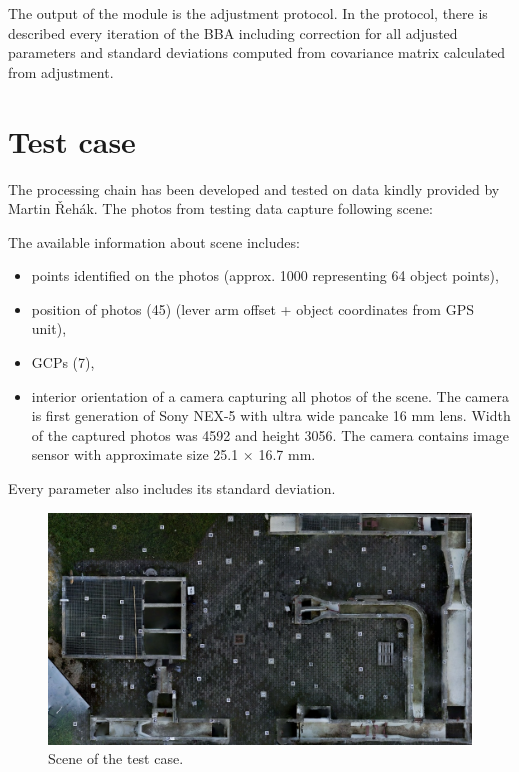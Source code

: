 \documentclass[a4paper,12pt]{article}
\begin{document}
The output of the module is the adjustment protocol. In the protocol, there
is described every iteration of the BBA including correction for all adjusted parameters and standard deviations computed from 
covariance matrix calculated from adjustment. 

\newpage
\section{Test case}
\label{sec:test_case}

The processing chain has been developed and tested on data kindly provided by Martin Řehák. 
The photos from testing data capture following scene:

\noindent The available information about scene includes:

\begin{itemize}
\item points identified on the photos (approx. 1000 representing 64 object points),
\item position of photos (45) (lever arm offset + object coordinates from GPS unit),
\item GCPs (7),
\item interior orientation of a camera capturing all photos of the scene.
The camera is first generation of Sony NEX-5 with ultra wide pancake 16 mm lens.
Width of the captured photos was 4592 and height 3056.
The camera contains image sensor with approximate size 25.1 × 16.7 mm.
\end{itemize}
Every parameter also includes its standard deviation. 

\begin{center}
 \begin{figure}[!h]
    \includegraphics[scale=0.4]{figures/calib_field.png}
    \caption{Scene of the test case.}
    \label{fig:test_case}
\end{figure}
\end{center}
\end{document}
